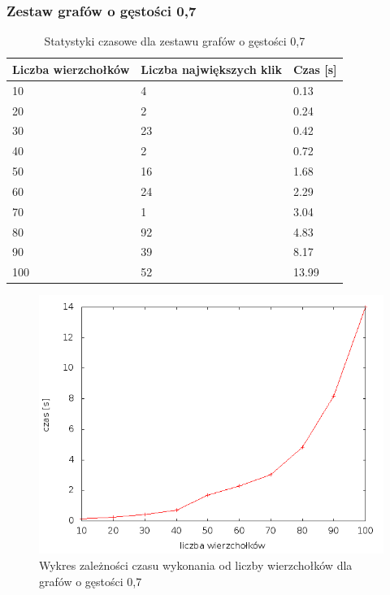 \documentclass[12pt, a4paper]{article}
\begin{document}
\subsubsection*{Zestaw grafów o gęstości 0,7}
\begin{table}[H]
\caption{Statystyki czasowe dla zestawu grafów o gęstości 0,7}
\begin{center}
    \begin{tabular}{|l|l|l|}
    \hline
    Liczba wierzchołków & Liczba największych klik & Czas [s] \\ \hline
    10 & 4 & 0.13 \\ \hline
    20 & 2 & 0.24 \\ \hline
    30 & 23 & 0.42 \\ \hline
    40 & 2 & 0.72 \\ \hline
    50 & 16 & 1.68 \\ \hline
    60 & 24 & 2.29 \\ \hline
    70 & 1 & 3.04 \\ \hline
    80 & 92 & 4.83 \\ \hline
    90 & 39 & 8.17 \\ \hline
    100 & 52 & 13.99 \\ \hline
    \end{tabular}
\end{center}
\end{table}

\begin{figure}[h]
    \begin{center}
	\includegraphics[scale=0.5]{../experiment_1/img/den/den_07.png}
	\caption{Wykres zależności czasu wykonania od liczby wierzchołków dla grafów o gęstości 0,7}
    \end{center}
\end{figure}
\end{document}
